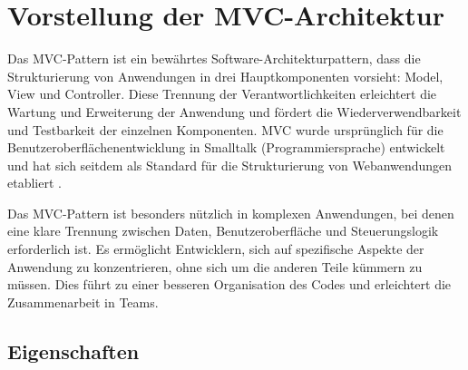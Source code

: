 
\chapter{Vorstellung der MVC-Architektur}
\label{chap:vorstellung}

Das \ac{MVC}-Pattern ist ein bewährtes Software-Architekturpattern, dass die Strukturierung von Anwendungen in drei Hauptkomponenten vorsieht: Model, View und Controller. Diese Trennung der Verantwortlichkeiten erleichtert die Wartung und Erweiterung der Anwendung und fördert die Wiederverwendbarkeit und Testbarkeit der einzelnen Komponenten. \ac{MVC} wurde ursprünglich für die Benutzeroberflächenentwicklung in Smalltalk (Programmiersprache) entwickelt und hat sich seitdem als Standard für die Strukturierung von Webanwendungen etabliert \cite{delessy2012securemvc}.

Das \ac{MVC}-Pattern ist besonders nützlich in komplexen Anwendungen, bei denen eine klare Trennung zwischen Daten, Benutzeroberfläche und Steuerungslogik erforderlich ist. Es ermöglicht Entwicklern, sich auf spezifische Aspekte der Anwendung zu konzentrieren, ohne sich um die anderen Teile kümmern zu müssen. Dies führt zu einer besseren Organisation des Codes und erleichtert die Zusammenarbeit in Teams.


\section{Eigenschaften}

